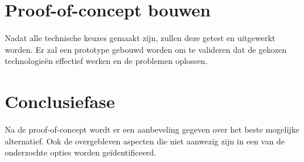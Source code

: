 \section{Proof-of-concept bouwen}
Nadat alle technische keuzes gemaakt zijn, zu\-llen deze getest en uitgewerkt worden. Er zal een prototype gebouwd worden om te valideren dat de gekozen technologieën effectief werken en de problemen oplossen.

\section{Conclusiefase}
Na de proof-of-concept wordt er een aanbeveling gegeven over het beste mogelijke alternatief. Ook de overgebleven  aspecten die niet aanwezig zijn in een van de onderzochte opties worden geïdentificeerd.